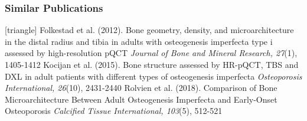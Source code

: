 \documentclass[xcolor=table]{beamer}
\begin{document}
\begin{frame}
	\frametitle{Similar Publications}
	\footnotesize{
		\begin{thebibliography}{99}
			[triangle]
			 Folkestad et al. (2012).
			\newblock Bone geometry, density, and microarchitecture in the distal radius and tibia in adults with osteogenesis imperfecta type i assessed by high-resolution pQCT
			\newblock \textit{Journal of Bone and Mineral Research, 27}(1), 1405-1412
			\vspace{1mm}
			 Kocijan et al. (2015).
			\newblock Bone structure assessed by HR-pQCT, TBS and DXL in adult patients with different types of osteogenesis imperfecta
			\newblock \textit{Osteoporosis International, 26}(10), 2431-2440
			\vspace{1mm}
			 Rolvien et al. (2018).
			\newblock Comparison of Bone Microarchitecture Between Adult Osteogenesis Imperfecta and Early-Onset Osteoporosis
			\newblock \textit{Calcified Tissue International, 103}(5), 512-521
		\end{thebibliography}
	}
\end{frame}

\end{document}
